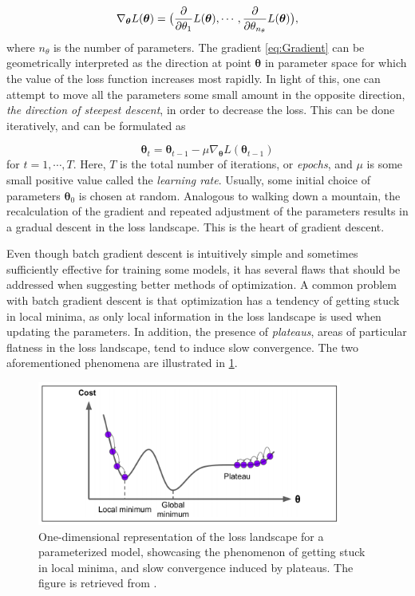 \begin{equation}\label{eq:Gradient}
    \nabla_{\boldsymbol{\theta}} L(\boldsymbol{\theta})= 
    \big{(} \frac{\partial}{\partial \theta_1} L(\boldsymbol{\theta}), 
    \cdots, \frac{\partial}{\partial \theta_{n_{\theta}}} L(\boldsymbol{\theta}) \big{)},
\end{equation}
where $n_{\theta}$ is the number of parameters. The gradient \cref{eq:Gradient} can be geometrically interpreted as the direction at point $\boldsymbol{\theta}$ in parameter space for which the value of the loss function increases most rapidly. In light of this, one can attempt to move all the parameters some small amount in the opposite direction, \emph{the direction of steepest descent}, in order to decrease the loss. This can be done iteratively, and can be formulated as 


\begin{equation}\label{eq:ParameterUpdate}
    \boldsymbol{\theta}_{t} = \boldsymbol{\theta}_{t-1} - \mu \nabla_{\boldsymbol{\theta}} L(\boldsymbol{\theta}_{t-1})
\end{equation}
for $t=1, \cdots, T$. Here, $T$ is the total number of  iterations, or \emph{epochs}, and $\mu$ is some small positive value called the \emph{learning rate}. Usually, some initial choice of parameters $\boldsymbol{\theta}_{0}$ is chosen at random. Analogous to walking down a mountain, the recalculation of the gradient and repeated adjustment of the parameters results in a gradual descent in the loss landscape. This is the heart of gradient descent.

Even though batch gradient descent is intuitively simple and sometimes sufficiently effective for training some models, it has several flaws that should be addressed when suggesting better methods of optimization. A common problem with batch gradient descent is that optimization has a tendency of getting stuck in local minima, as only local information in the loss landscape is used when updating the parameters. In addition, the presence of \emph{plateaus}, areas of particular flatness in the loss landscape, tend to induce slow convergence. The two aforementioned phenomena are illustrated in \cref{fig:localMinima}.  


\begin{figure}[htp]
    \centering
    \includegraphics[width=10cm]{latex/figures/local_minimum_saddle_point.png}
    \caption{One-dimensional representation of the loss landscape for a parameterized model, showcasing the phenomenon of getting stuck in local minima, and slow convergence induced by plateaus. The figure is retrieved from \citet{hands-on}.}
    \label{fig:localMinima}
\end{figure}

